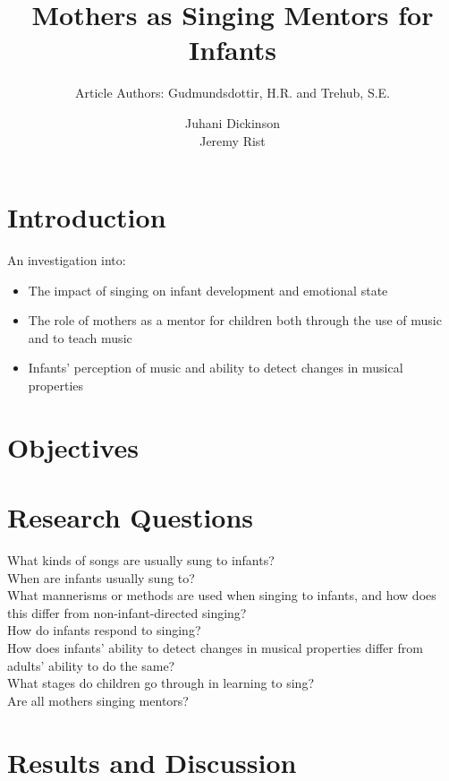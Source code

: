 \documentclass{beamer}
\title{Mothers as Singing Mentors for Infants}
\subtitle{Article Authors: Gudmundsdottir, H.R. and Trehub, S.E.}
\author[Juhani Dickinson, Jeremy Rist]{Juhani Dickinson \\ Jeremy Rist}
\begin{document}
\begin{frame}
	\titlepage
\end{frame}


\section{Introduction}
\begin{frame}
	An investigation into:
	\begin{itemize}
	\item The impact of singing on infant development and emotional state
	\item The role of mothers as a mentor for children both through the use of music and to teach music
	\item Infants' perception of music and ability to detect changes in musical properties
	\end{itemize}
\end{frame}

\section{Objectives}
\begin{frame}
\end{frame}

\section{Research Questions}
\begin{frame}
	What kinds of songs are usually sung to infants?\\
	When are infants usually sung to?\\
	What mannerisms or methods are used when singing to infants, and how does this differ from non-infant-directed singing?\\
	How do infants respond to singing?\\
	How does infants' ability to detect changes in musical properties differ from adults' ability to do the same?\\ %
	What stages do children go through in learning to sing?\\
	Are all mothers singing mentors?
\end{frame}

\section{Results and Discussion}
\end{document}
